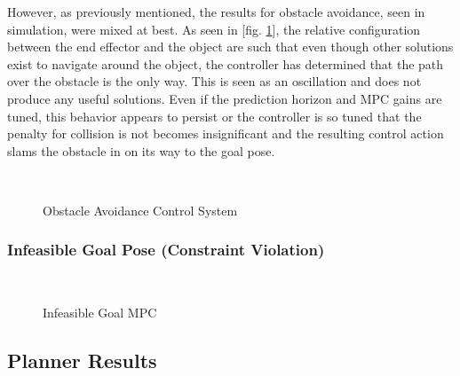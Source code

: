 \documentclass[journal]{IEEEtran}
\begin{document}
However, as previously mentioned, the results for obstacle avoidance, seen in simulation, were mixed at best. As seen in [fig. \ref{fig:obs_avoid_path_bad}], the relative configuration between the end effector and the object are such that even though other solutions exist to navigate around the object, the controller has determined that the path over the obstacle is the only way. This is seen as an oscillation and does not produce any useful solutions. Even if the prediction horizon and MPC gains are tuned, this behavior appears to persist or the controller is so tuned that the penalty for collision is not becomes insignificant and the resulting control action slams the obstacle in on its way to the goal pose.

\begin{figure}[ht]%
    \centering
    \qquad
    \\
    \caption{Obstacle Avoidance Control System}%
    \label{fig:obs_avoid_path_bad}%
\end{figure}


\subsubsection{Infeasible Goal Pose (Constraint Violation)}

\begin{figure}%
    \centering
    \qquad
    \\
    \caption{Infeasible Goal MPC}%
    \label{fig:infeasible_goal}%
\end{figure}

\subsection{Planner Results}
\end{document}
